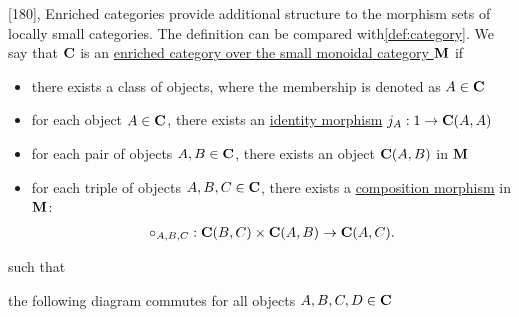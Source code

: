 \begin{definition}\label{def:enriched_category}\cite{MacLane1994}[180],\cite{nLab:enriched_category}
  Enriched categories provide additional structure to the morphism sets of locally small categories. The definition can be compared with\cref{def:category}. We say that $\operatorname{\mathbf{C}}$ is an \ul{enriched category over the small monoidal category $\operatorname{\mathbf{M}}$} if
  \begin{itemize}
    \item there exists a class of objects, where the membership is denoted as $A \in \operatorname{\mathbf{C}}$
    \item for each object $A \in \operatorname{\mathbf{C}}$, there exists an \ul{identity morphism} $j_A: 1 \to \operatorname{\mathbf{C}}(A, A)$
    \item for each pair of objects $A, B \in \operatorname{\mathbf{C}}$, there exists an object $\operatorname{\mathbf{C}}(A, B)$ in $\operatorname{\mathbf{M}}$
    \item for each triple of objects $A, B, C \in \operatorname{\mathbf{C}}$, there exists a \ul{composition morphism} in $\operatorname{\mathbf{M}}$:
    \begin{align*}
      \circ_{A,B,C}: {\operatorname{\mathbf{C}}}(B, C) \times {\operatorname{\mathbf{C}}}(A, B) \to {\operatorname{\mathbf{C}}}(A, C).
    \end{align*}
  \end{itemize}
  such that
  \begin{defenum}
    \item the following diagram commutes for all objects $A, B, C, D \in \operatorname{\mathbf{C}}$
    \begin{Center}
    \end{Center}


\end{defenum}
\end{definition}
